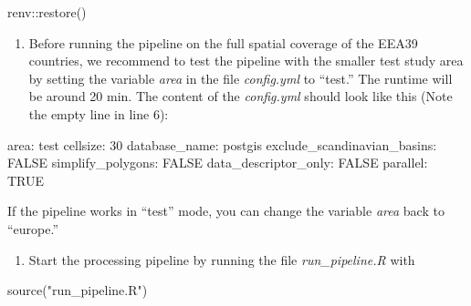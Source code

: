 \documentclass[fleqn,10pt]{wlscirep}
\providecommand{\tightlist}{%
  \setlength{\itemsep}{0pt}\setlength{\parskip}{0pt}}
\newenvironment{Shaded}{\begin{snugshade}}{\end{snugshade}}
\newcommand{\ConstantTok}[1]{\textcolor[rgb]{0.00,0.00,0.00}{#1}}
\newcommand{\DecValTok}[1]{\textcolor[rgb]{0.00,0.00,0.81}{#1}}
\newcommand{\FunctionTok}[1]{\textcolor[rgb]{0.00,0.00,0.00}{#1}}
\newcommand{\NormalTok}[1]{#1}
\newcommand{\SpecialCharTok}[1]{\textcolor[rgb]{0.00,0.00,0.00}{#1}}
\newcommand{\StringTok}[1]{\textcolor[rgb]{0.31,0.60,0.02}{#1}}
\begin{document}
\small

\begin{Shaded}
\begin{Highlighting}[]
\NormalTok{renv}\SpecialCharTok{::}\FunctionTok{restore}\NormalTok{()}
\end{Highlighting}
\end{Shaded}

\normalsize

\begin{enumerate}
\def\labelenumi{\arabic{enumi}.}
\setcounter{enumi}{7}
\tightlist
\item
  Before running the pipeline on the full spatial coverage of the EEA39 countries, we recommend to test the pipeline with the smaller test study area by setting the variable \emph{area} in the file \emph{config.yml} to ``test.'' The runtime will be around 20 min. The content of the \emph{config.yml} should look like this (Note the empty line in line 6):
\end{enumerate}

\small

\begin{Shaded}
\begin{Highlighting}[]
\NormalTok{area}\SpecialCharTok{:}\NormalTok{ test}
\NormalTok{cellsize}\SpecialCharTok{:} \DecValTok{30}
\NormalTok{database\_name}\SpecialCharTok{:}\NormalTok{ postgis}
\NormalTok{exclude\_scandinavian\_basins}\SpecialCharTok{:} \ConstantTok{FALSE}
\NormalTok{simplify\_polygons}\SpecialCharTok{:} \ConstantTok{FALSE}
\NormalTok{data\_descriptor\_only}\SpecialCharTok{:} \ConstantTok{FALSE}
\NormalTok{parallel}\SpecialCharTok{:} \ConstantTok{TRUE}
\end{Highlighting}
\end{Shaded}

\normalsize
If the pipeline works in ``test'' mode, you can change the variable \emph{area} back to ``europe.''

\begin{enumerate}
\def\labelenumi{\arabic{enumi}.}
\setcounter{enumi}{8}
\tightlist
\item
  Start the processing pipeline by running the file \emph{run\_pipeline.R} with
\end{enumerate}

\small

\begin{Shaded}
\begin{Highlighting}[]
\FunctionTok{source}\NormalTok{(}\StringTok{"run\_pipeline.R"}\NormalTok{)}
\end{Highlighting}
\end{Shaded}
\end{document}
